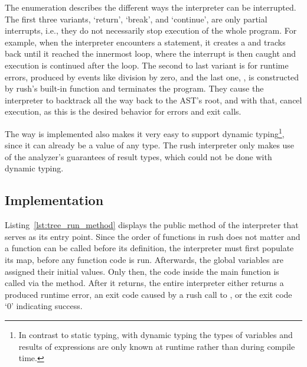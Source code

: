 The enumeration  describes the different ways the interpreter can be interrupted.
The first three variants, `return', `break', and `continue', are only partial interrupts, i.e., they do not necessarily stop execution of the whole program.
For example, when the interpreter encounters a  statement, it creates a  and tracks back until it reached the innermost loop, where the interrupt is then caught and execution is continued after the loop.
The second to last variant is for runtime errors, produced by events like division by zero, and the last one, , is constructed by rush's built-in  function and terminates the program.
They cause the interpreter to backtrack all the way back to the AST's root, and with that, cancel execution, as this is the desired behavior for errors and exit calls.

The way  is implemented also makes it very easy to support dynamic typing\footnote{In contrast to static typing, with dynamic typing the types of variables and results of expressions are only known at runtime rather than during compile time.}, since it can already be a value of any type.
The rush interpreter only makes use of the analyzer's guarantees of result types, which could not be done with dynamic typing.

\subsection{Implementation}


Listing~\ref{lst:tree_run_method} displays the public  method of the interpreter that serves as its entry point.
Since the order of functions in rush does not matter and a function can be called before its definition, the interpreter must first populate its  map, before any function code is run.
Afterwards, the global variables are assigned their initial values.
Only then, the code inside the main function is called via the  method.
After it returns, the entire interpreter either returns a produced runtime error, an exit code caused by a rush call to , or the exit code `0' indicating success.



